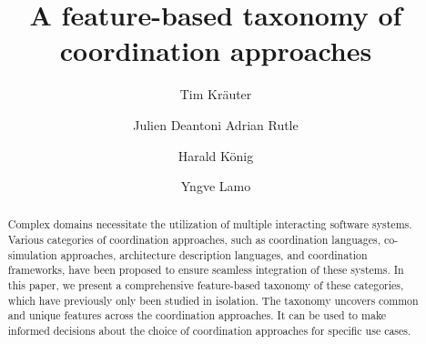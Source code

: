 \documentclass[runningheads]{llncs}
\begin{document}
\title{A feature-based taxonomy of coordination approaches}

\author{Tim Kr\"{a}uter \and
Julien Deantoni
Adrian Rutle \and
Harald K\"{o}nig \and
Yngve Lamo}
%
%
\maketitle

\begin{abstract}

Complex domains necessitate the utilization of multiple interacting software systems.
Various categories of coordination approaches, such as coordination languages, co-simulation approaches, architecture description languages, and coordination frameworks, have been proposed to ensure seamless integration of these systems.
In this paper, we present a comprehensive feature-based taxonomy of these categories, which have previously only been studied in isolation.
The taxonomy uncovers common and unique features across the coordination approaches.
It can be used to make informed decisions about the choice of coordination approaches for specific use cases.

\end{abstract}

\end{document}
